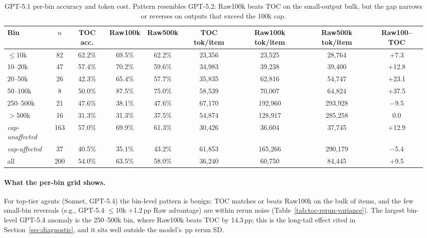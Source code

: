 \documentclass{article}
\begin{document}
\begin{table}[h]
\centering
\scriptsize
\setlength{\tabcolsep}{4pt}
\begin{tabular}{lcccccccc}
\toprule
Bin & $n$ & TOC acc. & Raw100k & Raw500k & TOC tok/item & Raw100k tok/item & Raw500k tok/item & Raw100--TOC \\
\midrule
$\le$10k & 82 & 62.2\% & 69.5\% & 62.2\% & 23{,}356 & 23{,}525 & 28{,}764 & $+$7.3 \\
10--20k & 47 & 57.4\% & 70.2\% & 59.6\% & 34{,}983 & 39{,}238 & 39{,}400 & $+$12.8 \\
20--50k & 26 & 42.3\% & 65.4\% & 57.7\% & 35{,}835 & 62{,}816 & 54{,}747 & $+$23.1 \\
50--100k & 8 & 50.0\% & 87.5\% & 75.0\% & 58{,}539 & 70{,}007 & 64{,}824 & $+$37.5 \\
250--500k & 21 & 47.6\% & 38.1\% & 47.6\% & 67{,}170 & 192{,}960 & 293{,}928 & $-$9.5 \\
$>$500k & 16 & 31.3\% & 31.3\% & 37.5\% & 54{,}874 & 128{,}917 & 285{,}258 & 0.0 \\
\midrule
\textit{cap-unaffected} & 163 & 57.0\% & 69.9\% & 61.3\% & 30{,}426 & 36{,}604 & 37{,}745 & $+$12.9 \\
\textit{cap-affected} & 37 & 40.5\% & 35.1\% & 43.2\% & 61{,}853 & 165{,}266 & 290{,}179 & $-$5.4 \\
all & 200 & 54.0\% & 63.5\% & 58.0\% & 36{,}240 & 60{,}750 & 84{,}445 & $+$9.5 \\
\bottomrule
\end{tabular}
\caption{GPT-5.1 per-bin accuracy and token cost. Pattern resembles GPT-5.2: Raw100k beats TOC on the small-output bulk, but the gap narrows or reverses on outputs that exceed the 100k cap.}
\label{tab:appendix-bin-gpt51}
\end{table}

\paragraph{What the per-bin grid shows.}
For top-tier agents (Sonnet, GPT-5.4) the bin-level pattern is benign: TOC matches or beats Raw100k on the bulk of items, and the few small-bin reversals (e.g., GPT-5.4 ${\le}$10k $+$1.2\,pp Raw advantage) are within rerun noise (Table~\ref{tab:toc-rerun-variance}). The largest bin-level GPT-5.4 anomaly is the 250--500k bin, where Raw100k beats TOC by 14.3\,pp; this is the long-tail effect cited in Section~\ref{sec:diagnostic}, and it sits well outside the model's \GPTFiveFourTOCRerunSD\,pp rerun SD.
\end{document}
